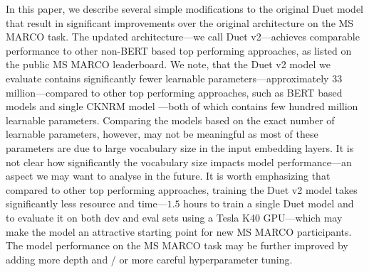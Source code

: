 \documentclass{article}
\begin{document}
In this paper, we describe several simple modifications to the original Duet model that result in significant improvements over the original architecture on the MS MARCO task.
The updated architecture---we call Duet v2---achieves comparable performance to other non-BERT based top performing approaches, as listed on the public MS MARCO leaderboard.
We note, that the Duet v2 model we evaluate contains significantly fewer learnable parameters---approximately $33$ million---compared to other top performing approaches, such as BERT based models \citep{nogueira2019passage} and single CKNRM model \citep{dai2018convolutional}---both of which contains few hundred million learnable parameters.
Comparing the models based on the exact number of learnable parameters, however, may not be meaningful as most of these parameters are due to large vocabulary size in the input embedding layers.
It is not clear how significantly the vocabulary size impacts model performance---an aspect we may want to analyse in the future.
It is worth emphasizing that compared to other top performing approaches, training the Duet v2 model takes significantly less resource and time---$1.5$ hours to train a single Duet model and to evaluate it on both dev and eval sets using a Tesla K40 GPU---which may make the model an attractive starting point for new MS MARCO participants.
The model performance on the MS MARCO task may be further improved by adding more depth and / or more careful hyperparameter tuning.
 


\end{document}
